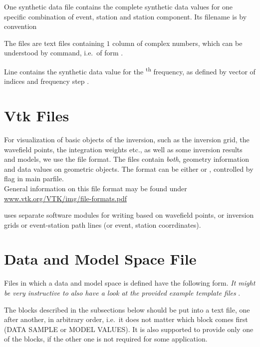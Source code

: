 One synthetic data file contains the complete synthetic data values for one specific combination of
event, station and station component. Its filename is by convention 

The files are text files containing $1$ column of   
complex numbers, which can be understood by   command, i.e.\ of form  .

Line  contains the synthetic data value for the \textsuperscript{th} frequency, as defined by vector
of indices  and frequency step .
%
\section{Vtk Files} \label{files,sec:vtk_files}
%
For visualization of basic objects of the inversion, such as the inversion grid, 
the wavefield points, the integration weights etc., as well as some inversion results
and models, we use the  file format. The files contain \emph{both}, geometry
information and data values on geometric objects. The format can be either  or 
, controlled by flag  in main parfile.\\
General information on this file format may be found under \url{www.vtk.org/VTK/img/file-formats.pdf}

\ASKI{} uses separate software modules for writing  based on wavefield points, or 
inversion grids or event-station path lines (or event, station coorrdinates). 
%
\section{Data and Model Space File} \label{files,sec:dmspace}
%
Files in which a data and model space is defined have the following form. \emph{It might be very instructive 
to also have a look at the provided example template files}  .

The blocks described in the subsections below should be put into a text file, one after another, in arbitrary order, 
i.e.\ it does not matter which block comes first (DATA SAMPLE or MODEL VALUES). It is
also supported to provide only one of the blocks, if the other one is not required for some application. 


